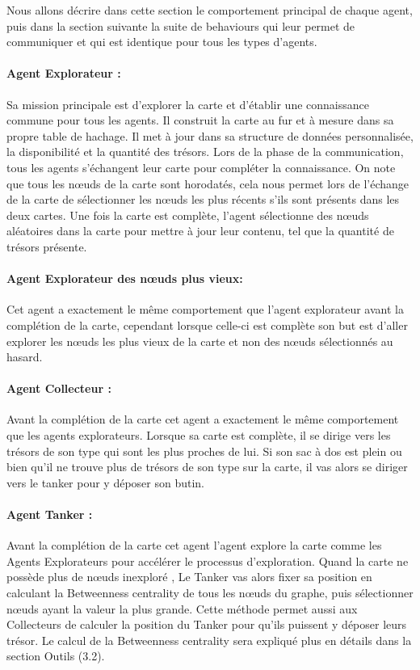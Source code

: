\documentclass[10pt]{article}
\newcommand\tab[1][0.65cm]{\hspace*{#1}}
\begin{document}
	\tab Nous allons décrire dans cette section le comportement principal de chaque agent, puis dans la section suivante la suite de behaviours qui leur permet de communiquer et qui est identique pour tous les types d'agents.

\paragraph{Agent Explorateur :}
Sa mission principale est d'explorer la carte et d'établir une connaissance commune pour tous les agents. Il construit la carte au fur et à mesure dans sa propre table de hachage. Il met à jour dans sa structure de données personnalisée, la disponibilité et la quantité des trésors. Lors de la phase de la communication, tous les agents s'échangent leur carte pour compléter la connaissance. On note que tous les n\oe{}uds de la carte sont horodatés, cela nous permet lors de l'échange de la carte de sélectionner les n\oe{}uds les plus récents s'ils sont présents dans les deux cartes. Une fois la carte est complète, l'agent sélectionne des n\oe{}uds aléatoires dans la carte pour mettre à jour leur contenu, tel que la quantité de trésors présente.

\paragraph{Agent Explorateur des n\oe{}uds plus vieux:}
Cet agent a exactement le même comportement que l'agent explorateur avant la complétion de la carte, cependant lorsque celle-ci est complète son but est d'aller explorer les n\oe{}uds les plus vieux de la carte et non des n\oe{}uds sélectionnés au hasard.

\paragraph{Agent Collecteur :} Avant la complétion de la carte cet agent a exactement le même comportement que les agents explorateurs. Lorsque sa carte est complète, il se dirige vers les trésors de son type qui sont les plus proches de lui. Si son sac à dos est plein ou bien qu'il ne trouve plus de trésors de son type sur la carte, il vas alors se diriger vers le tanker pour y déposer son butin.

\paragraph{Agent Tanker :} Avant la complétion de la carte cet agent l'agent explore la carte comme les Agents Explorateurs pour accélérer le processus d'exploration. Quand la carte ne possède plus de n\oe{}uds inexploré , Le Tanker vas alors fixer sa position en calculant la Betweenness centrality de tous les n\oe{}uds du graphe, puis sélectionner n\oe{}uds ayant la valeur la plus grande. Cette méthode permet aussi aux Collecteurs de calculer la position du Tanker pour qu'ils puissent y déposer leurs trésor. Le calcul de la Betweenness centrality sera expliqué plus en détails dans la section Outils (3.2).
\end{document}
